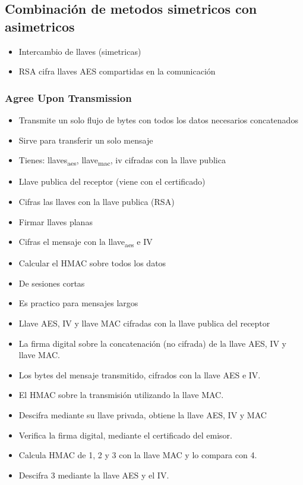 \documentclass[11pt]{article}
\begin{document}
\subsection{Combinación de metodos simetricos con asimetricos}
\label{sec:orgd8cda29}
\begin{itemize}
\item Intercambio de llaves (simetricas)
\item RSA cifra llaves AES compartidas en la comunicación
\end{itemize}
\subsubsection{Agree Upon Transmission}
\label{sec:orgf07bba4}
\begin{itemize}
\item Transmite un solo flujo de bytes con todos los datos necesarios concatenados
\item Sirve para transferir un solo mensaje
\item Tienes: llaves\textsubscript{aes}, llave\textsubscript{mac}, iv cifradas con la llave publica
\item Llave publica del receptor (viene con el certificado)
\item Cifras las llaves con la llave publica (RSA)
\item Firmar llaves planas
\item Cifras el mensaje con la llave\textsubscript{aes} e IV
\item Calcular el HMAC sobre todos los datos
\item De sesiones cortas
\item Es practico para mensajes largos

\item Llave AES, IV y llave MAC cifradas con la llave publica del receptor
\item La firma digital sobre la concatenación (no cifrada) de la llave AES, IV y llave MAC.
\item Los bytes del mensaje transmitido, cifrados con la llave AES e IV.
\item El HMAC sobre la transmisión utilizando la llave MAC.

\item Descifra mediante su llave privada, obtiene la llave AES, IV y MAC
\item Verifica la firma digital, mediante el certificado del emisor.
\item Calcula HMAC de 1, 2 y 3 con la llave MAC y lo compara con 4.
\item Descifra 3 mediante la llave AES y el IV.
\end{itemize}
\end{document}
